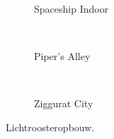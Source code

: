 \begin{figure}[t]
\begin{minipage}[t]{0.5\textwidth}
\begin{adjustbox}{minipage=\textwidth, scale=0.55}
\begin{subfigure}[b]{1.6\textwidth}
      \centering
      \def\svgwidth{\textwidth}
      
      \caption{Spaceship Indoor}
      \vspace{4pt}
      \label{fig:ts-lc-resolution:indoor}
    \end{subfigure}
  \end{adjustbox} \\
  \begin{adjustbox}{minipage=\textwidth, scale=0.55}
    \begin{subfigure}[b]{1.6\textwidth}
      \centering
      \def\svgwidth{\textwidth}
      
      \caption{Piper's Alley}
      \vspace{4pt}
      \label{fig:ts-lights-grid:alley}
    \end{subfigure}
  \end{adjustbox} \\
  \begin{adjustbox}{minipage=\textwidth, scale=0.55}
    \begin{subfigure}[b]{1.6\textwidth}
      \centering
      \def\svgwidth{\textwidth}
      
      \caption{Ziggurat City}
      \label{fig:ts-lights-grid:city}
    \end{subfigure}
  \end{adjustbox}
  \caption{\small Lichtroosteropbouw. }
  \label{fig:ts-lights-grid}
  \end{minipage}
\end{figure}

